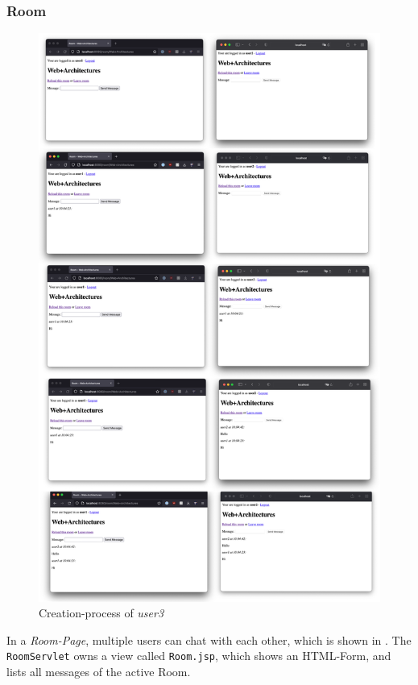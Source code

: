 \subsubsection{Room}\label{subsubsec:03_impl_servlets_room}
\begin{figure}[h]
\centering
\includegraphics[scale=0.3]{images/03_impl/room/chat_all_steps}
\caption{Creation-process of \textit{user3}}
\label{fig:03_impl_servlets_admin_chat}
\end{figure}
In a \textit{Room-Page}, multiple users can chat with each other, which is shown in .
The \texttt{RoomServlet} owns a view called \texttt{Room.jsp}, which shows an HTML-Form, and lists all messages of the active Room.

